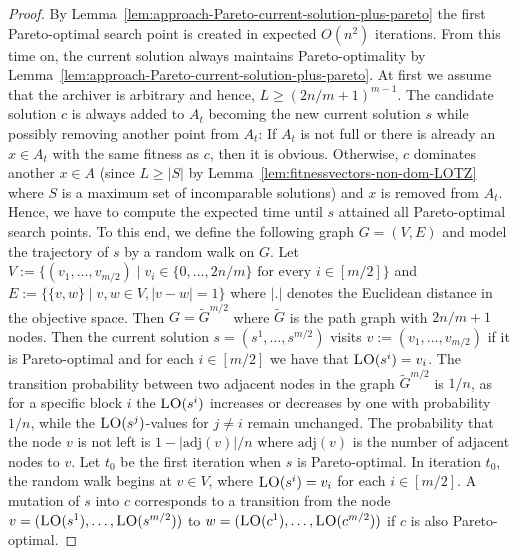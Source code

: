 \documentclass[
sigconf = false, %
review = false, %
screen = true, %
anonymous = true, %
format=acmsmall
]{acmart}
\newcommand{\LO}{\textsc{LO}\xspace}                      %
\begin{document}
\begin{proof}
By Lemma~\ref{lem:approach-Pareto-current-solution-plus-pareto} the first Pareto-optimal search point is created in expected $O(n^2)$ iterations. From this time on, the current solution always maintains Pareto-optimality by Lemma~\ref{lem:approach-Pareto-current-solution-plus-pareto}. At first we assume that the archiver is arbitrary and hence, $L \geq (2n/m+1)^{m-1}$. The candidate solution $c$ is always added to $A_t$ becoming the new current solution $s$ while possibly removing another point from $A_t$: If $A_t$ is not full or there is already an $x \in A_t$ with the same fitness as $c$, then it is obvious. Otherwise, $c$ dominates another $x \in A$ (since $L \geq |S|$ by Lemma~\ref{lem:fitnessvectors-non-dom-LOTZ} where $S$ is a maximum set of incomparable solutions) and $x$ is removed from $A_t$. Hence, we have to compute the expected time until $s$ attained all Pareto-optimal search points. To this end, we define the following graph $G=(V,E)$ and model the trajectory of $s$ by a random walk on $G$. Let $V:=\{(v_1, \ldots , v_{m/2}) \mid v_i \in \{0, \ldots , 2n/m\} \text{ for every } i \in [m/2]\}$ and $E:=\{\{v,w\} \mid v,w \in V, |v-w|=1\}$ where $|.|$ denotes the Euclidean distance in the objective space. Then $G = \tilde{G}^{m/2}$ where $\tilde{G}$ is the path graph with $2n/m+1$ nodes. Then the current solution $s=(s^1, \ldots , s^{m/2})$ visits $v:=(v_1, \ldots ,v_{m/2})$ if it is Pareto-optimal and for each $i \in [m/2]$ we have that $\LO(s^i) = v_i$. The transition probability between two adjacent nodes in the graph $\tilde{G}^{m/2}$ is $1/n$, as for a specific block $i$ the $\LO(s^i)$ increases or decreases by one with probability $1/n$, while the $\LO(s^j)$-values for $j \neq i$ remain unchanged. The probability that the node $v$ is not left is $1-|\text{adj}(v)|/n$ where $\text{adj}(v)$ is the number of adjacent nodes to $v$. %
Let $t_0$ be the first iteration when $s$ is Pareto-optimal. In iteration $t_0$, the random walk begins at $v \in V$, where $\LO(s^i)=v_i$ for each $i \in [m/2]$. A mutation of $s$ into $c$ corresponds to a transition from the node $v=(\LO(s^1), \ldots , \LO(s^{m/2}))$ to 
$w=(\LO(c^1), \ldots , \LO(c^{m/2}))$ if $c$ is also Pareto-optimal. 

\end{proof}
\end{document}
